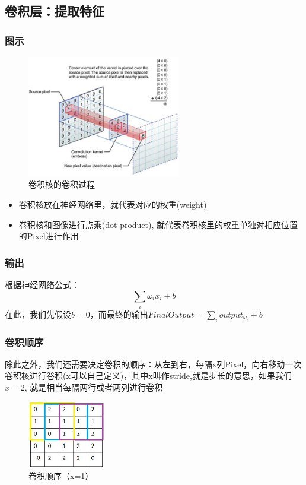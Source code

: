\documentclass[UTF8]{ctexart}
\begin{document}
\subsection{卷积层：提取特征}
\subsubsection{图示}
\begin{figure}[htb]
	\centering
	\includegraphics[width=0.6\textwidth]{figures/convolution1.jpg}
	\caption{卷积核的卷积过程}
	\label{convolution1}
\end{figure}
\begin{itemize}
	\item 卷积核放在神经网络里，就代表对应的权重(weight)
	\item 卷积核和图像进行点乘(dot product), 就代表卷积核里的权重单独对相应位置的Pixel进行作用
\end{itemize}
\subsubsection{输出}
根据神经网络公式：
$$\sum_i \omega_ix_i + b$$
在此，我们先假设$b=0$，而最终的输出$FinalOutput = \sum_ioutput_{\omega_i} + b$
\subsubsection{卷积顺序}
除此之外，我们还需要决定卷积的顺序：从左到右，每隔x列Pixel，向右移动一次卷积核进行卷积(x可以自己定义)，其中x叫作stride,就是步长的意思，如果我们$x = 2$, 就是相当每隔两行或者两列进行卷积
\begin{figure}[htb]
	\centering
	\includegraphics[width=0.3\textwidth]{figures/sequence1.jpg}
	\caption{卷积顺序（x=1）}
	\label{sequence1}
\end{figure}
\end{document}

